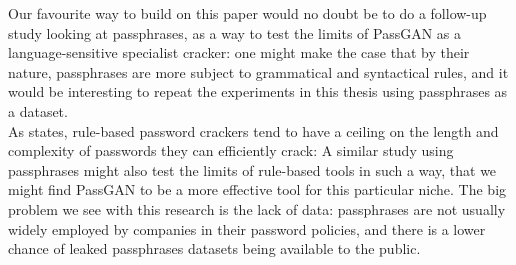 Our favourite way to build on this paper would no doubt be to do a follow-up study looking at passphrases, as a way to test the limits of PassGAN as a language-sensitive specialist cracker: one might make the case that by their nature, passphrases are more subject to grammatical and syntactical rules, and it would be interesting to repeat the experiments in this thesis using passphrases as a dataset. \\
As \cite{Melicher2016} states, rule-based password crackers tend to have a ceiling on the length and complexity of passwords they can efficiently crack: A similar study using passphrases might also test the limits of rule-based tools in such a way, that we might find PassGAN to be a more effective tool for this particular niche. The big problem we see with this research is the lack of data: passphrases are not usually widely employed by companies in their password policies, and there is a lower chance of leaked passphrases datasets being available to the public.  
